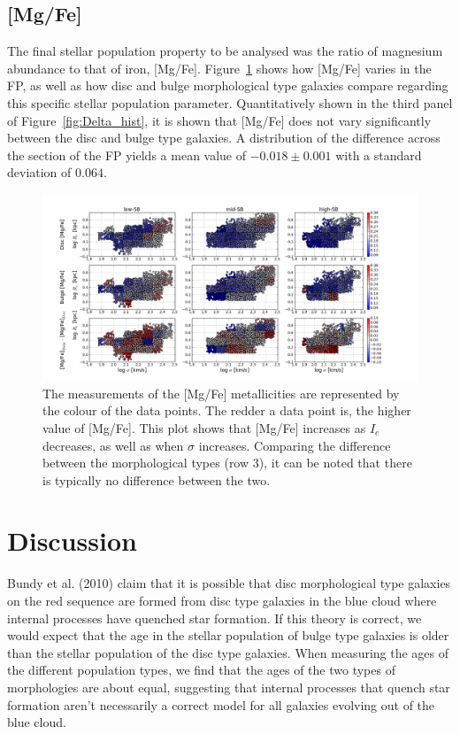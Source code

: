 \documentclass[showcase, preprintnumbers, amsmath, amssymb, bibnotes, 12pt]{revtex4}
\begin{document}
\subsection{[Mg/Fe]}


The final stellar population property to be analysed was the ratio of magnesium abundance to that of iron, [Mg/Fe]. Figure~\ref{fig:MgFe_maps} shows how [Mg/Fe] varies in the FP, as well as how disc and bulge morphological type galaxies compare regarding this specific stellar population parameter. Quantitatively shown in the third panel of Figure~\ref{fig:Delta_hist}, it is shown that [Mg/Fe] does not vary significantly between the disc and bulge type galaxies. A distribution of the difference across the section of the FP yields a mean value of $-0.018\pm0.001$ with a standard deviation of $0.064$.

\begin{figure}
\begin{center}
\includegraphics[scale=0.43]{MgFe_map_9panel.png}
\end{center}
\caption{The measurements of the [Mg/Fe] metallicities are represented by the colour of the data points. The redder a data point is, the higher value of [Mg/Fe]. This plot shows that [Mg/Fe] increases as $I_e$ decreases, as well as when $\sigma$ increases. Comparing the difference between the morphological types (row 3), it can be noted that there is typically no difference between the two. \label{fig:MgFe_maps}}
\end{figure}

\section{Discussion}

Bundy et al. (2010) claim that it is possible that disc morphological type galaxies on the red sequence are formed from disc type galaxies in the blue cloud where internal processes have quenched star formation. If this theory is correct, we would expect that the age in the stellar population of bulge type galaxies is older than the stellar population of the disc type galaxies. When measuring the ages of the different population types, we find that the ages of the two types of morphologies are about equal, suggesting that internal processes that quench star formation aren't necessarily a correct model for all galaxies evolving out of the blue cloud.
\end{document}
